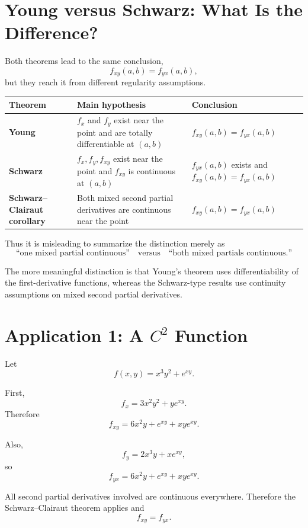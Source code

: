 \documentclass[11pt,oneside]{book}
\theoremstyle{studentthm}
\theoremstyle{definition}
\begin{document}
\section{Young versus Schwarz: What Is the Difference?}

Both theorems lead to the same conclusion,
\[
f_{xy}(a,b)=f_{yx}(a,b),
\]
but they reach it from different regularity assumptions.

\begin{center}
\renewcommand{\arraystretch}{1.35}
\begin{tabularx}{0.94\textwidth}{
>{\bfseries}p{}
p{}
X}
\toprule
Theorem & Main hypothesis & Conclusion\\
\midrule
Young
&
\(f_x\) and \(f_y\) exist near the point and are totally
differentiable at \((a,b)\)
&
\(
f_{xy}(a,b)=f_{yx}(a,b)
\)
\\
Schwarz
&
\(f_x,f_y,f_{xy}\) exist near the point and \(f_{xy}\) is
continuous at \((a,b)\)
&
\(f_{yx}(a,b)\) exists and
\(
f_{xy}(a,b)=f_{yx}(a,b)
\)
\\
Schwarz--Clairaut corollary
&
Both mixed second partial derivatives are continuous near the point
&
\(
f_{xy}(a,b)=f_{yx}(a,b)
\)
\\
\bottomrule
\end{tabularx}
\end{center}

Thus it is misleading to summarize the distinction merely as
\[
\text{``one mixed partial continuous''}
\quad\text{versus}\quad
\text{``both mixed partials continuous.''}
\]

The more meaningful distinction is that Young's theorem uses
differentiability of the first-derivative functions, whereas the
Schwarz-type results use continuity assumptions on mixed second
partial derivatives.

\section{Application 1: A \(C^2\) Function}

Let
\[
f(x,y)=x^3y^2+e^{xy}.
\]

First,
\[
f_x=3x^2y^2+ye^{xy}.
\]
Therefore
\[
f_{xy}=6x^2y+e^{xy}+xye^{xy}.
\]

Also,
\[
f_y=2x^3y+xe^{xy},
\]
so
\[
f_{yx}=6x^2y+e^{xy}+xye^{xy}.
\]

All second partial derivatives involved are continuous everywhere.
Therefore the Schwarz--Clairaut theorem applies and
\[
f_{xy}=f_{yx}.
\]
\end{document}
